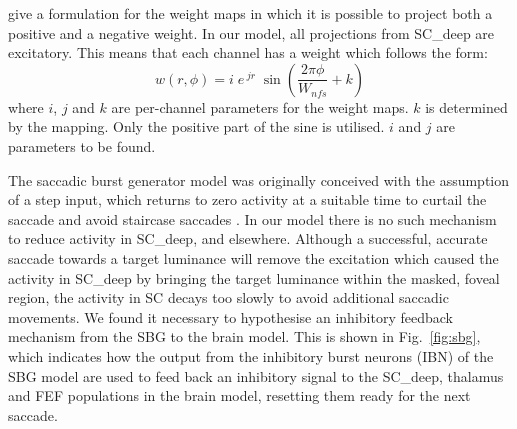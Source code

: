 \documentclass{frontiersSCNS}
\begin{document}
\cite{tabareau_geometry_2007} give a formulation for the weight maps
in which it is possible to project both a positive and a negative
weight. In our model, all projections from SC\_deep are excitatory.
This means that each channel has a weight which follows the form:
\begin{equation} \label{eq:weightmaps}
w(r,\phi) = i\;e\,^{jr}\;\sin\left(\frac{2\pi\phi}{W_{nfs}} + k\right)
\end{equation}
where $i$, $j$ and $k$ are per-channel parameters for the weight
maps. $k$ is determined by the mapping. Only the positive part of the
sine is utilised. $i$ and $j$ are parameters to be found.

The saccadic burst generator model was originally conceived with the
assumption of a step input, which returns to zero activity at a
suitable time to curtail the saccade and avoid staircase
saccades \citep{gancarz_neural_1998}. In our model there is no such
mechanism to reduce activity in SC\_deep, and elsewhere.  Although a
successful, accurate saccade towards a target luminance will remove
the excitation which caused the activity in SC\_deep by bringing the
target luminance within the masked, foveal region, the activity in SC
decays too slowly to avoid additional saccadic movements. We found it
necessary to hypothesise an inhibitory feedback mechanism from the SBG
to the brain model.  This is shown in Fig.~\ref{fig:sbg}, which
indicates how the output from the inhibitory burst neurons (IBN) of
the SBG model are used to feed back an inhibitory signal to the
SC\_deep, thalamus and FEF populations in the brain model, resetting
them ready for the next saccade. 
\end{document}
